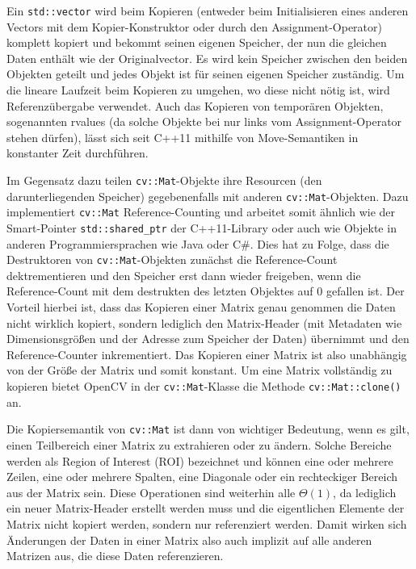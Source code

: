 \documentclass{whswinvcbook}
\begin{document}
Ein \texttt{std::vector} wird beim Kopieren (entweder beim Initialisieren eines anderen Vectors mit dem Kopier-Konstruktor oder durch den Assignment-Operator) komplett kopiert und bekommt seinen eigenen Speicher, der nun die gleichen Daten enthält wie der Originalvector. Es wird kein Speicher zwischen den beiden Objekten geteilt und jedes Objekt ist für seinen eigenen Speicher zuständig. Um die lineare Laufzeit beim Kopieren zu umgehen, wo diese nicht nötig ist, wird Referenzübergabe verwendet. Auch das Kopieren von temporären Objekten, sogenannten rvalues (da solche Objekte bei nur links vom Assignment-Operator stehen dürfen), lässt sich seit C++11 mithilfe von Move-Semantiken in konstanter Zeit durchführen.

Im Gegensatz dazu teilen \texttt{cv::Mat}-Objekte ihre Resourcen (den darunterliegenden Speicher) gegebenenfalls mit anderen \texttt{cv::Mat}-Objekten. Dazu implementiert \texttt{cv::Mat} Reference-Counting und arbeitet somit ähnlich wie der Smart-Pointer \texttt{std::shared\_ptr} der C++11-Library oder auch wie Objekte in anderen Programmiersprachen wie Java oder C\#. Dies hat zu Folge, dass die Destruktoren von \texttt{cv::Mat}-Objekten zunächst die Reference-Count dektrementieren und den Speicher erst dann wieder freigeben, wenn die Reference-Count mit dem destrukten des letzten Objektes auf $0$ gefallen ist. Der Vorteil hierbei ist, dass das Kopieren einer Matrix genau genommen die Daten nicht wirklich kopiert, sondern lediglich den Matrix-Header (mit Metadaten wie Dimensionsgrößen und der Adresse zum Speicher der Daten) übernimmt und den Reference-Counter inkrementiert. Das Kopieren einer Matrix ist also unabhängig von der Größe der Matrix und somit konstant. Um eine Matrix vollständig zu kopieren bietet OpenCV in der \texttt{cv::Mat}-Klasse die Methode \texttt{cv::Mat::clone()} an.

Die Kopiersemantik von \texttt{cv::Mat} ist dann von wichtiger Bedeutung, wenn es gilt, einen Teilbereich einer Matrix zu extrahieren oder zu ändern. Solche Bereiche werden als Region of Interest (ROI) bezeichnet und können eine oder mehrere Zeilen, eine oder mehrere Spalten, eine Diagonale oder ein rechteckiger Bereich aus der Matrix sein. Diese Operationen sind weiterhin alle $\Theta(1)$, da lediglich ein neuer Matrix-Header erstellt werden muss und die eigentlichen Elemente der Matrix nicht kopiert werden, sondern nur referenziert werden. Damit wirken sich Änderungen der Daten in einer Matrix also auch implizit auf alle anderen Matrizen aus, die diese Daten referenzieren.
\end{document}
